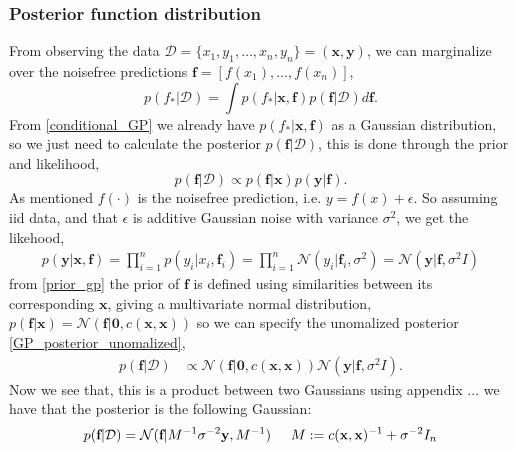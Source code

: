 \subsubsection{Posterior function distribution}
From observing the data $\mathcal{D} = \{x_1,y_1, \dots , x_n,y_n\} = (\textbf{x}, \textbf{y})$, we can marginalize over the noisefree
predictions $\textbf{f} = [f(x_1), \dots, f(x_n)]$, 
\begin{equation}\label{posterior_function_new}
    p(f_*|\mathcal{D})= \int p(f_*|\textbf{x}, \textbf{f})p(\textbf{f}|\mathcal{D})d\textbf{f}.
\end{equation} 
From \eqref{conditional_GP} we already have $p(f_*|\textbf{x}, \textbf{f})$ as a Gaussian distribution, so we just need to
calculate the posterior $p(\textbf{f}|\mathcal{D})$, this is done through the prior and likelihood, 
\begin{equation}\label{GP_posterior_unomalized}
    p(\textbf{f}|\mathcal{D}) \propto p(\textbf{f}|\textbf{x}) p(\textbf{y}|\textbf{f}).
\end{equation}
As mentioned $f(\cdot)$ is the noisefree prediction, i.e. $y
= f(x)+ \epsilon$. So assuming iid data, and that $\epsilon$ is additive Gaussian
noise with variance $\sigma^2$, we get the likehood, 
\begin{align*}
    p(\textbf{y}|\textbf{x}, \textbf{f}) = \prod_{i=1}^n p(y_i|x_i,\textbf{f}_i) = \prod_{i=1}^n \mathcal{N}(y_i|\textbf{f}_i,\sigma^2) = \mathcal{N}(\textbf{y}|\textbf{f},\sigma^2 I)
\end{align*}
from \eqref{prior_gp} the prior of $\textbf{f}$ is defined using similarities between its corresponding $\textbf{x}$, giving a
multivariate normal distribution, 
$p(\textbf{f}|\textbf{x}) = \mathcal{N}(\textbf{f}|\textbf{0},c(\textbf{x}, \textbf{x}))$
so we can specify the unomalized posterior \eqref{GP_posterior_unomalized},
\begin{align*}
    p(\textbf{f}|\mathcal{D}) &\propto \mathcal{N}(\textbf{f}|\textbf{0}, c(\textbf{x}, \textbf{x})) \mathcal{N}(\textbf{y}|\textbf{f},\sigma^2 I).
\end{align*}
Now we see that, this is a product between two Gaussians using appendix ...
we have that the posterior is the following Gaussian: 
\begin{equation*}
    p(\textbf{f}|\mathcal{D}) = \mathcal{N}(\textbf{f}|M^{-1} \sigma^{-2}\textbf{y}, M^{-1}) \hspace{0.5cm}M := c(\textbf{x}, \textbf{x})^{-1}+\sigma^{-2} I_n
\end{equation*}

